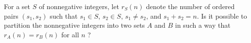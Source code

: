 For a set  $S$  of nonnegative integers, let  $r_S(n)$  denote the number of
ordered pairs  $(s_1, s_2)$  such that  $s_1 \in S$, $s_2 \in S$, $s_1 \ne
s_2$,
and  $s_1 + s_2 = n$.  Is it possible to partition the nonnegative
integers into two sets  $A$  and  $B$  in such a way that  $r_A(n) = r_B(n)$
for all  $n$ ?
